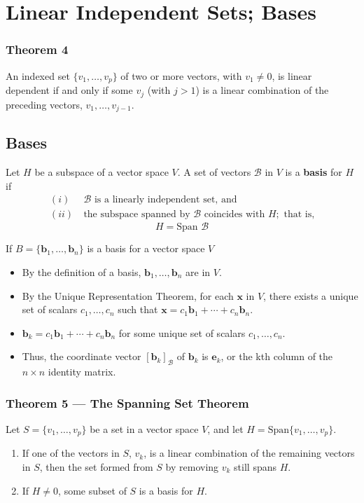 \documentclass{article}
\begin{document}
\section*{Linear Independent Sets; Bases}

\subsubsection*{Theorem 4}
An indexed set $\{v_1, \ldots, v_p\}$ of two or more vectors, with $v_1 \neq 0$, is linear
dependent if and only if some $v_j$ (with $j > 1$) is a linear combination of the preceding
vectors, $v_1, \ldots, v_{j-1}$.

\subsection*{Bases}
Let $H$ be a subspace of a vector space $V$. A set of vectors $\mathcal{B}$ in $V$ is a
\textbf{basis} for $H$ if
\begin{align*}
    (i) & \ \mathcal{B} \text{ is a linearly independent set, and} \\
    (ii) & \ \text{the subspace spanned by } \mathcal{B} \text{ coincides with } H;
    \text{ that is,}
\end{align*}
\[H = \text{Span } \mathcal{B}\]

If $B=\{\mathbf{b}_1, \ldots, \mathbf{b}_n\}$ is a basis for a vector space $V$
\begin{itemize}
    \item By the definition of a basis, $\mathbf{b}_1, \ldots, \mathbf{b}_n$ are in $V$.
    \item By the Unique Representation Theorem, for each $\mathbf{x}$ in $V$, there exists a unique
    set of scalars $c_1, \ldots, c_n$ such that
    $\mathbf{x}=c_1\mathbf{b}_1 + \cdots + c_n\mathbf{b}_n$.
    \item $\mathbf{b}_k=c_1\mathbf{b}_1 + \cdots + c_n\mathbf{b}_n$ for some unique set of scalars
    $c_1, \ldots, c_n$.
    \item Thus, the coordinate vector ${[\mathbf{b}_k]}_\mathcal{B}$ of $\mathbf{b}_k$ is
    $\mathbf{e}_k$, or the kth column of the $n\times n$ identity matrix.
\end{itemize}

\subsubsection*{Theorem 5 --- The Spanning Set Theorem}
Let $S=\{v_1, \ldots, v_p\}$ be a set in a vector space $V$, and let
$H=\text{Span}\{v_1, \ldots, v_p\}$.
\begin{enumerate}
    \item If one of the vectors in $S$, $v_k$, is a linear combination of the remaining vectors in
    $S$, then the set formed from $S$ by removing $v_k$ still spans $H$.
    \item If $H\neq {0}$, some subset of $S$ is a basis for $H$.
\end{enumerate}
\end{document}
